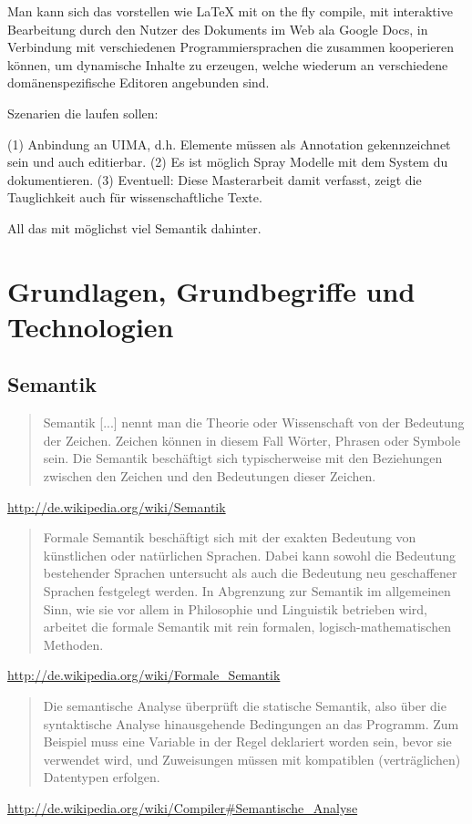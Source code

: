 Man kann sich das vorstellen wie LaTeX mit on the fly compile,
mit interaktive Bearbeitung durch den Nutzer des Dokuments im Web ala
Google Docs, in Verbindung mit verschiedenen Programmiersprachen
die zusammen kooperieren können, um dynamische Inhalte zu erzeugen,
welche wiederum an verschiedene domänenspezifische Editoren angebunden sind.

Szenarien die laufen sollen:

(1) Anbindung an UIMA, d.h. Elemente müssen als Annotation gekennzeichnet sein
und auch editierbar.
(2) Es ist möglich Spray Modelle mit dem System du dokumentieren.
(3) Eventuell: Diese Masterarbeit damit verfasst, zeigt die Tauglichkeit
auch für wissenschaftliche Texte.

All das mit möglichst viel Semantik dahinter.





\chapter{Grundlagen, Grundbegriffe und Technologien}

\section{Semantik}

\begin{quote}Semantik [...] nennt man die Theorie oder Wissenschaft von der Bedeutung der Zeichen.
Zeichen können in diesem Fall Wörter, Phrasen oder Symbole sein. Die Semantik beschäftigt sich 
typischerweise mit den Beziehungen zwischen den Zeichen und den Bedeutungen dieser Zeichen.
\end{quote}
\url{http://de.wikipedia.org/wiki/Semantik}

\begin{quote}Formale Semantik beschäftigt sich mit der exakten Bedeutung von künstlichen
oder natürlichen Sprachen. Dabei kann sowohl die Bedeutung bestehender Sprachen untersucht
als auch die Bedeutung neu geschaffener Sprachen festgelegt werden.
In Abgrenzung zur Semantik im allgemeinen Sinn, wie sie vor allem in Philosophie und Linguistik
betrieben wird, arbeitet die formale Semantik mit rein formalen, logisch-mathematischen Methoden.
\end{quote}
\url{http://de.wikipedia.org/wiki/Formale_Semantik}

\begin{quote}Die semantische Analyse überprüft die statische Semantik,
also über die syntaktische Analyse hinausgehende Bedingungen an das Programm.
Zum Beispiel muss eine Variable in der Regel deklariert worden sein, bevor sie verwendet wird,
und Zuweisungen müssen mit kompatiblen (verträglichen) Datentypen erfolgen.
\end{quote}
\url{http://de.wikipedia.org/wiki/Compiler#Semantische_Analyse}

